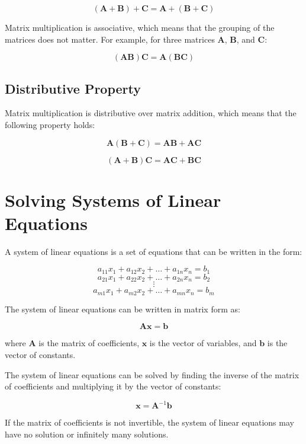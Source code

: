 \documentclass[11pt]{article}
\begin{document}
    \[
(\mathbf{A} + \mathbf{B}) + \mathbf{C} = \mathbf{A} + (\mathbf{B} + \mathbf{C})
\]

    Matrix multiplication is associative, which means that the grouping of the matrices does not matter. For example, for three matrices \( \mathbf{A} \), \( \mathbf{B} \), and \( \mathbf{C} \):

    \[
(\mathbf{A} \mathbf{B}) \mathbf{C} = \mathbf{A} (\mathbf{B} \mathbf{C})
\]

    \subsection{Distributive Property}

    Matrix multiplication is distributive over matrix addition, which means that the following property holds:

    \[
\mathbf{A} (\mathbf{B} + \mathbf{C}) = \mathbf{A} \mathbf{B} + \mathbf{A} \mathbf{C}
\]

    \[
(\mathbf{A} + \mathbf{B}) \mathbf{C} = \mathbf{A} \mathbf{C} + \mathbf{B} \mathbf{C}

\]


\section{Solving Systems of Linear Equations}

    A system of linear equations is a set of equations that can be written in the form:

    \[
a_{11} x_1 + a_{12} x_2 + \ldots + a_{1n} x_n = b_1
\]
\[
a_{21} x_1 + a_{22} x_2 + \ldots + a_{2n} x_n = b_2
\]
\[
\vdots
\]
\[
a_{m1} x_1 + a_{m2} x_2 + \ldots + a_{mn} x_n = b_m
\]

    The system of linear equations can be written in matrix form as:

    \[
\mathbf{A} \mathbf{x} = \mathbf{b}
\]

    where \( \mathbf{A} \) is the matrix of coefficients, \( \mathbf{x} \) is the vector of variables, and \( \mathbf{b} \) is the vector of constants.

    The system of linear equations can be solved by finding the inverse of the matrix of coefficients and multiplying it by the vector of constants:

    \[
\mathbf{x} = \mathbf{A}^{-1} \mathbf{b}
\]

    If the matrix of coefficients is not invertible, the system of linear equations may have no solution or infinitely many solutions.
\end{document}

